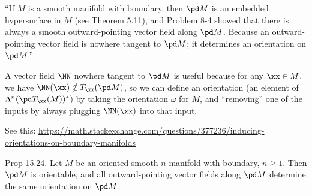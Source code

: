 
\item ``If $M$ is a smooth manifold with boundary, then $\pd M$ is an embedded hypersurface in $M$ (see Theorem 5.11), and Problem 8-4 showed that there is always a smooth outward-pointing vector field along $\pd M$. Because an outward-pointing vector field is nowhere tangent to $\pd M$; it determines an orientation on $\pd M$.''
    
A vector field $\NN$ nowhere tangent to $\pd M$ is useful because for any $\xx \in M$, we have $\NN(\xx) \notin T_\xx(\pd M)$, so we can define an orientation (an element of $\Lambda^n(\pd T_\xx(M))^*$) by taking the orientation $\omega$ for $M$, and ``removing'' one of the inputs by always plugging $\NN(\xx)$ into that input.
    
See this: \url{https://math.stackexchange.com/questions/377236/inducing-orientations-on-boundary-manifolds}
    
Prop 15.24. Let $M$ be an oriented smooth $n$-manifold with boundary, $n \geq 1$. Then $\pd M$ is orientable, and all outward-pointing vector fields along $\pd M$ determine the same orientation on $\pd M$.
    

